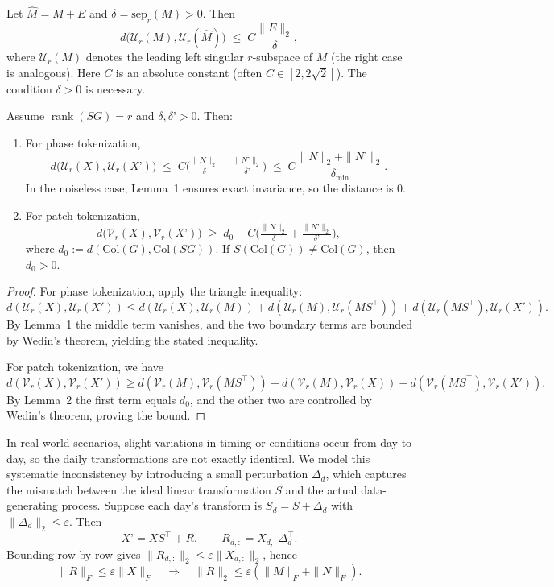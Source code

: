 \begin{lemma}
Let $\widehat M=M+E$ and $\delta=\mathrm{sep}_r(M)>0$. Then
\[
d\big(\mathcal U_r(M),\mathcal U_r(\widehat M)\big) \;\le\; C \frac{\|E\|_2}{\delta},
\]
where $\mathcal U_r(M)$ denotes the leading left singular $r$-subspace of $M$ (the right case is analogous). 
Here $C$ is an absolute constant (often $C\in[2,2\sqrt2]$). The condition $\delta>0$ is necessary.
\end{lemma}

\begin{theorem}
Assume $\operatorname{rank}(S G)=r$ and $\delta,\delta’>0$. Then:

\begin{enumerate}
\item For phase tokenization,
\[
d\big(\mathcal U_r(X), \mathcal U_r(X’)\big) \;\le\;
C\Big(\tfrac{\|N\|_2}{\delta}+\tfrac{\|N’\|_2}{\delta’}\Big)
\;\le\; C\frac{\|N\|_2+\|N’\|_2}{\delta_{\min}}.
\]
In the noiseless case, Lemma~1 ensures exact invariance, so the distance is $0$.

\item For patch tokenization,
\[
d\big(\mathcal V_r(X), \mathcal V_r(X’)\big) \;\ge\;
d_0 - C\Big(\tfrac{\|N\|_2}{\delta}+\tfrac{\|N’\|_2}{\delta’}\Big),
\]
where $d_0 := d(\mathrm{Col}(G),\mathrm{Col}(S G))$. If $S(\mathrm{Col}(G))\neq\mathrm{Col}(G)$, then $d_0>0$.
\end{enumerate}
\end{theorem}

\begin{proof}
For phase tokenization, apply the triangle inequality:
\[
d(\mathcal U_r(X),\mathcal U_r(X'))
\le d(\mathcal U_r(X),\mathcal U_r(M))
+ d(\mathcal U_r(M),\mathcal U_r(MS^\top))
+ d(\mathcal U_r(MS^\top),\mathcal U_r(X')).
\]
By Lemma~1 the middle term vanishes, and the two boundary terms are bounded by Wedin’s theorem, yielding the stated inequality.  

For patch tokenization, we have
\[
d(\mathcal V_r(X),\mathcal V_r(X'))
\ge d(\mathcal V_r(M),\mathcal V_r(MS^\top))
- d(\mathcal V_r(M),\mathcal V_r(X))
- d(\mathcal V_r(MS^\top),\mathcal V_r(X')).
\]
By Lemma~2 the first term equals $d_0$, and the other two are controlled by Wedin’s theorem, proving the bound.
\end{proof}

In real-world scenarios, slight variations in timing or conditions occur from day to day, so the daily transformations are not exactly identical. 
We model this systematic inconsistency by introducing a small perturbation $\Delta_d$, which captures the mismatch between the ideal linear transformation $S$ and the actual data-generating process.
Suppose each day’s transform is $S_d=S+\Delta_d$ with $\|\Delta_d\|_2\le\varepsilon$. Then
\[
X’ = X S^\top + R, \qquad R_{d,:}=X_{d,:}\Delta_d^\top.
\]
Bounding row by row gives $\|R_{d,:}\|_2 \le \varepsilon\|X_{d,:}\|_2$, hence
\[
\|R\|_F \le \varepsilon \|X\|_F \quad \Rightarrow \quad 
\|R\|_2 \le \varepsilon(\|M\|_F+\|N\|_F).
\]

